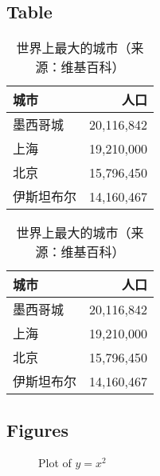 \documentclass[
    11pt,
    notheorems,
    hyperref={pdfauthor=whatever}
]{beamer}
\begin{document}
\subsection{Table}
\begin{frame}
    \begin{table}
        \caption{世界上最大的城市（来源：维基百科）}
        \begin{tabular}{@{} lr @{}}
            \toprule
            城市 & 人口 \\
            \midrule
            墨西哥城 & 20,116,842 \\
            上海 & 19,210,000 \\
            北京 & 15,796,450 \\
            伊斯坦布尔 & 14,160,467 \\
            \bottomrule
        \end{tabular}
        \hspace*{1cm}
            \setlength\extrarowheight{3pt}
        \begin{tabular}{|lr|}
            \hline
            \rowcolor{primary}\color{white}城市 & \color{white}人口 \\
            \hline
            墨西哥城 & 20,116,842 \\
            上海 & 19,210,000 \\
            北京 & 15,796,450 \\
            伊斯坦布尔 & 14,160,467 \\
            \hline
        \end{tabular}
    \end{table}
\end{frame}


\subsection{Figures}
\begin{frame}
    \begin{figure}[htbp]
        \centering
        \caption{Plot of $y=x^2$}
    \end{figure}
\end{frame}
\end{document}
